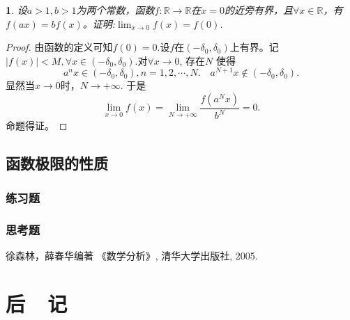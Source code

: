 \documentclass[utf8]{book}
\newtheorem{example}{}[section]             %
\begin{document}
\begin{example}
设$a>1,b>1$为两个常数，函数$f:\mathbb{R}\rightarrow \mathbb{R}$在$x=0$的近旁有界，且$\forall x\in\mathbb{R}$，有$f(ax)=bf(x)$。证明:$\displaystyle\lim_{x\to 0}f(x)=f(0)$.
\end{example}
\begin{proof}
由函数的定义可知$f(0) = 0$.设$f$在$(-\delta_0, \delta_0)$上有界。记$|f(x)| < M, \forall x\in (-\delta_0, \delta_0)$.对$\forall x \to 0$, 存在$N$
使得$$a^nx\in (-\delta_0, \delta_0), n=1,2,\cdots, N. \quad a^{N+1}x\notin (-\delta_0, \delta_0).$$
显然当$x\to 0$时，$N\to +\infty$.
于是
$$\displaystyle\lim_{x\to 0}f(x) = \displaystyle\lim_{N\to +\infty}\frac{f(a^Nx)}{b^{N}} = 0.$$
命题得证。
\end{proof}
\section{函数极限的性质}
\subsection{练习题}
\subsection{思考题}









\appendix


\renewcommand\indexname{索~~引}
\printindex
{}

\backmatter


\begin{thebibliography}{参考文献}
 徐森林，薛春华编著 《数学分析》, 清华大学出版社, 2005.
\end{thebibliography}

\chapter{后~~记}

\begin{flushright}

\end{flushright}
\end{document}
